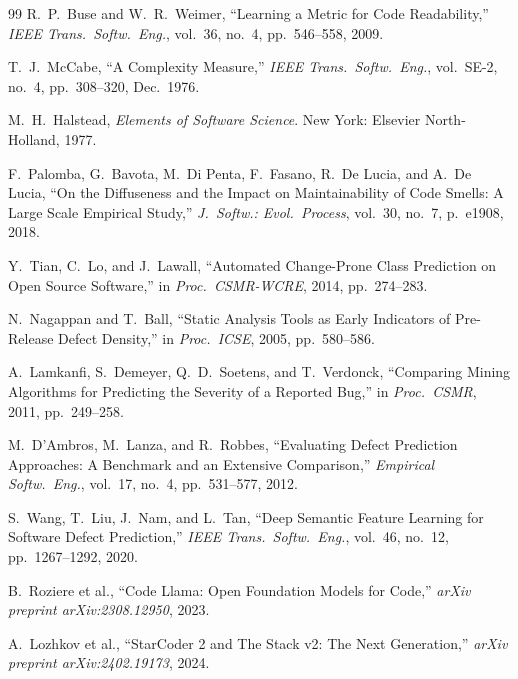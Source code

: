 \documentclass[12pt, a4paper]{report}
\begin{document}
\begin{thebibliography}{99}
R.\ P.\ Buse and W.\ R.\ Weimer, ``Learning a Metric for Code Readability,'' \textit{IEEE Trans.\ Softw.\ Eng.}, vol.\ 36, no.\ 4, pp.\ 546--558, 2009.

T.\ J.\ McCabe, ``A Complexity Measure,'' \textit{IEEE Trans.\ Softw.\ Eng.}, vol.\ SE-2, no.\ 4, pp.\ 308--320, Dec.\ 1976.

M.\ H.\ Halstead, \textit{Elements of Software Science}. New York: Elsevier North-Holland, 1977.

F.\ Palomba, G.\ Bavota, M.\ Di Penta, F.\ Fasano, R.\ De Lucia, and A.\ De Lucia, ``On the Diffuseness and the Impact on Maintainability of Code Smells: A Large Scale Empirical Study,'' \textit{J.\ Softw.: Evol.\ Process}, vol.\ 30, no.\ 7, p.\ e1908, 2018.

Y.\ Tian, C.\ Lo, and J.\ Lawall, ``Automated Change-Prone Class Prediction on Open Source Software,'' in \textit{Proc.\ CSMR-WCRE}, 2014, pp.\ 274--283.

N.\ Nagappan and T.\ Ball, ``Static Analysis Tools as Early Indicators of Pre-Release Defect Density,'' in \textit{Proc.\ ICSE}, 2005, pp.\ 580--586.

A.\ Lamkanfi, S.\ Demeyer, Q.\ D.\ Soetens, and T.\ Verdonck, ``Comparing Mining Algorithms for Predicting the Severity of a Reported Bug,'' in \textit{Proc.\ CSMR}, 2011, pp.\ 249--258.

M.\ D'Ambros, M.\ Lanza, and R.\ Robbes, ``Evaluating Defect Prediction Approaches: A Benchmark and an Extensive Comparison,'' \textit{Empirical Softw.\ Eng.}, vol.\ 17, no.\ 4, pp.\ 531--577, 2012.

S.\ Wang, T.\ Liu, J.\ Nam, and L.\ Tan, ``Deep Semantic Feature Learning for Software Defect Prediction,'' \textit{IEEE Trans.\ Softw.\ Eng.}, vol.\ 46, no.\ 12, pp.\ 1267--1292, 2020.

B.\ Roziere et al., ``Code Llama: Open Foundation Models for Code,''
\textit{arXiv preprint arXiv:2308.12950}, 2023.

A.\ Lozhkov et al., ``StarCoder 2 and The Stack v2: The Next Generation,''
\textit{arXiv preprint arXiv:2402.19173}, 2024.

\end{thebibliography}
\end{document}

